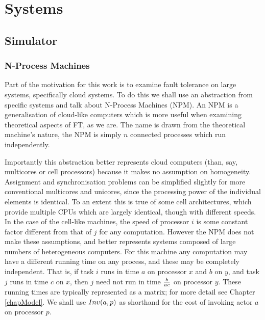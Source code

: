 \chapter{Systems}
\label{chapSystems}

\section{Simulator}

\subsection{N-Process Machines}
\label{secSystemNPM}

Part of the motivation for this work is to examine fault tolerance on large systems, specifically cloud systems.
To do this we shall use an abstraction from specific systems and talk about N-Process Machines (NPM).
An NPM is a generalisation of cloud-like computers which is more useful when examining theoretical aspects of FT, as we are.
The name is drawn from the theoretical machine's nature, the NPM is simply $n$ connected processes which run independently.

Importantly this abstraction better represents cloud computers (than, say, multicores or cell processors) because it makes no assumption on homogeneity.
Assignment and synchronisation problems can be simplified slightly for more conventional multicores and unicores, since the processing power of the individual elements is identical.
To an extent this is true of some cell architectures, which provide multiple CPUs which are largely identical, though with different speeds.
In the case of the cell-like machines, the speed of processor $i$ is some constant factor different from that of $j$ for any computation.
However the NPM does not make these assumptions, and better represents systems composed of large numbers of heterogeneous computers.
For this machine any computation may have a different running time on any process, and these may be completely independent.
That is, if task $i$ runs in time $a$ on processor $x$ and $b$ on $y$, and task $j$ runs in time $c$ on $x$, then $j$ need not run in time ${b}\over{a}c$ on processor $y$.
These running times are typically represented as a matrix; for more detail see Chapter \ref{chapModel}.
We shall use $Inv(a, p)$ as shorthand for the cost of invoking actor $a$ on processor $p$.

